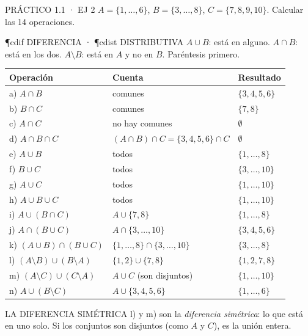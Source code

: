 \begin{enunciado}{PRÁCTICO 1.1 · EJ 2}
$A=\{1,\dots,6\}$, $B=\{3,\dots,8\}$, $C=\{7,8,9,10\}$. Calcular las 14 operaciones.
\end{enunciado}
\begin{uso}{\P{cdif} DIFERENCIA · \P{cdist} DISTRIBUTIVA}
$A\cup B$: está en alguno. $A\cap B$: está en los dos. $A\setminus B$: está en $A$ y no en $B$. Paréntesis primero.
\end{uso}
\begin{center}\small
\begin{tabular}{@{}lll@{}}\toprule
Operación & Cuenta & Resultado\\\midrule
a) $A\cap B$ & comunes & $\{3,4,5,6\}$\\
b) $B\cap C$ & comunes & $\{7,8\}$\\
c) $A\cap C$ & no hay comunes & $\emptyset$\\
d) $A\cap B\cap C$ & $(A\cap B)\cap C=\{3,4,5,6\}\cap C$ & $\emptyset$\\
e) $A\cup B$ & todos & $\{1,\dots,8\}$\\
f) $B\cup C$ & todos & $\{3,\dots,10\}$\\
g) $A\cup C$ & todos & $\{1,\dots,10\}$\\
h) $A\cup B\cup C$ & todos & $\{1,\dots,10\}$\\
i) $A\cup(B\cap C)$ & $A\cup\{7,8\}$ & $\{1,\dots,8\}$\\
j) $A\cap(B\cup C)$ & $A\cap\{3,\dots,10\}$ & $\{3,4,5,6\}$\\
k) $(A\cup B)\cap(B\cup C)$ & $\{1,\dots,8\}\cap\{3,\dots,10\}$ & $\{3,\dots,8\}$\\
l) $(A\setminus B)\cup(B\setminus A)$ & $\{1,2\}\cup\{7,8\}$ & $\{1,2,7,8\}$\\
m) $(A\setminus C)\cup(C\setminus A)$ & $A\cup C$ (son disjuntos) & $\{1,\dots,10\}$\\
n) $A\cup(B\setminus C)$ & $A\cup\{3,4,5,6\}$ & $\{1,\dots,6\}$\\\bottomrule
\end{tabular}
\end{center}
\begin{memo}{LA DIFERENCIA SIMÉTRICA}
l) y m) son la \emph{diferencia simétrica}: lo que está en uno solo. Si los conjuntos son disjuntos (como $A$ y $C$), es la unión entera.
\end{memo}

